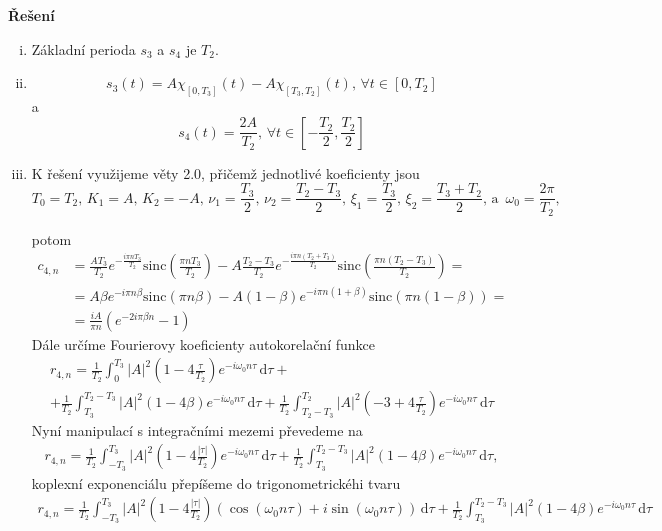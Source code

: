 \documentclass{article}
\begin{document}
\noindent \textbf{Řešení}
\begin{enumerate}[(i)]
\item Základní perioda $s_3$ a $s_4$ je $T_2$.
\item
\[
    s_3(t) = A\chi_{[0,T_3]}(t) -A \chi_{[T_3,T_2]}(t),\,\forall t\in [0, T_2]
\]
a
\[
    s_4(t) = \frac{2A}{T_2},\,\forall t\in \left[-\frac{T_2}{2}, \frac{T_2}{2}\right]
\]

\item K řešení využijeme věty 2.0, přičemž jednotlivé koeficienty jsou
\[
    T_0 = T_2,\,K_1 = A,\,K_2=-A,\,\nu_1 = \frac{T_3}{2}, \,\nu_2=\frac{T_2-T_3}{2},\, \xi_1 = \frac{T_3}{2},\,\xi_2=\frac{T_3+T_2}{2},\, \text{a }\,\omega_0 = \frac{2\pi}{T_2},
\]

potom
\begin{align*}
    c_{4,n} &= \frac{A T_3}{T_2} e^{-\frac{i \pi  n T_3}{T_2}} \text{sinc}\left(\frac{\pi  n T_3}{T_2}\right)-A \frac{T_2-T_3}{T_2} e^{-\frac{i \pi  n \left(T_2+T_3\right)}{T_2}} \text{sinc}\left(\frac{\pi  n \left(T_2-T_3\right)}{T_2}\right) = \\ &= A \beta e^{-i \pi  n \beta} \text{sinc}\left(\pi  n \beta\right)-A \left(1-\beta\right) e^{-i \pi  n \left(1+\beta\right)} \text{sinc}\left(\pi  n \left(1-\beta\right)\right) = \\ &= \frac{i A}{\pi n} \left(e^{-2 i \pi  \beta  n}-1\right)
\end{align*}
Dále určíme Fourierovy koeficienty autokorelační funkce
\begin{multline*}
    r_{4, n} = \frac{1}{T_2}\int_0^{T_3} |A|^2 \left(1-4\frac{\tau}{T_2}\right)e^{-i\omega_0 n \tau}\,\mathrm{d}\tau + \\ + \frac{1}{T_2}\int_{T_3}^{T_2-T_3} |A|^2 \left(1-4\beta\right)e^{-i\omega_0 n \tau}\,\mathrm{d}\tau + \frac{1}{T_2}\int_{T_2-T_3}^{T_2} |A|^2 \left(-3+4\frac{\tau}{T_2}\right)e^{-i\omega_0 n \tau}\,\mathrm{d}\tau
\end{multline*}
Nyní manipulací s integračními mezemi převedeme na
\begin{align*}
    r_{4,n}=\frac{1}{T_2}\int_{-T_3}^{T_3} |A|^2 \left(1-4\frac{|\tau|}{T_2}\right)e^{-i\omega_0 n \tau}\,\mathrm{d}\tau +\frac{1}{T_2}\int_{T_3}^{T_2-T_3} |A|^2 \left(1-4\beta\right)e^{-i\omega_0 n \tau}\,\mathrm{d}\tau,
\end{align*}
koplexní exponenciálu přepíšeme do trigonometrickéhi tvaru
\begin{align*}
    r_{4,n}=\frac{1}{T_2}\int_{-T_3}^{T_3} |A|^2 \left(1-4\frac{|\tau|}{T_2}\right)\left(\cos(\omega_0 n \tau) + i \sin(\omega_0 n \tau)\right)\,\mathrm{d}\tau +\frac{1}{T_2}\int_{T_3}^{T_2-T_3} |A|^2 \left(1-4\beta\right)e^{-i\omega_0 n \tau}\,\mathrm{d}\tau

\end{align*}
\end{enumerate}
\end{document}
